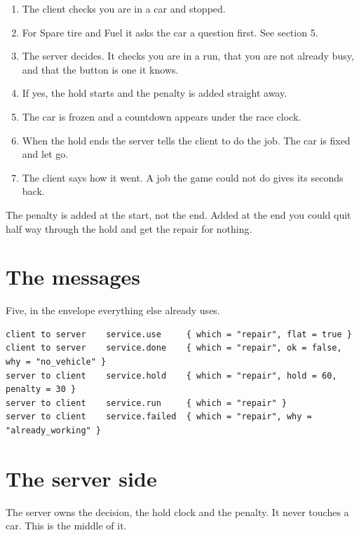 \documentclass[11pt,a4paper]{article}
\begin{document}
\begin{enumerate}
  \item The client checks you are in a car and stopped.
  \item For Spare tire and Fuel it asks the car a question first. See section 5.
  \item The server decides. It checks you are in a run, that you are not already
        busy, and that the button is one it knows.
  \item If yes, the hold starts and the penalty is added straight away.
  \item The car is frozen and a countdown appears under the race clock.
  \item When the hold ends the server tells the client to do the job. The car is
        fixed and let go.
  \item The client says how it went. A job the game could not do gives its
        seconds back.
\end{enumerate}

The penalty is added at the start, not the end. Added at the end you could quit
half way through the hold and get the repair for nothing.

\section{The messages}

Five, in the envelope everything else already uses.

\begin{lstlisting}
client to server    service.use     { which = "repair", flat = true }
client to server    service.done    { which = "repair", ok = false, why = "no_vehicle" }
server to client    service.hold    { which = "repair", hold = 60, penalty = 30 }
server to client    service.run     { which = "repair" }
server to client    service.failed  { which = "repair", why = "already_working" }
\end{lstlisting}

\section{The server side}

The server owns the decision, the hold clock and the penalty. It never touches a
car. This is the middle of it.
\end{document}
